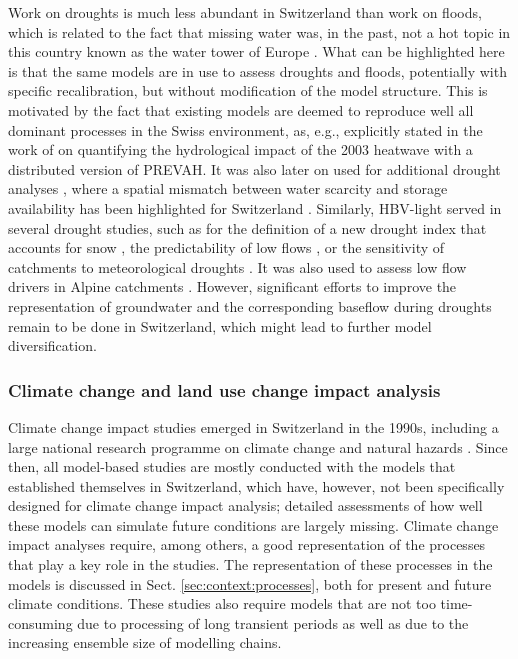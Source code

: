 \documentclass[10pt,a4paper]{article}
\begin{document}
Work on droughts is much less abundant in Switzerland than work on floods, which is related to the fact that missing water was, in the past, not a hot topic in this country known as the water tower of Europe \citep{Milano2015}. What can be highlighted here is that the same models are in use to assess droughts and floods, potentially with specific recalibration, but without modification of the model structure. This is motivated by the fact that existing models are deemed to reproduce well all dominant processes in the Swiss environment, as, e.g., explicitly stated in the work of \citet{Zappa2007a} on quantifying the hydrological impact of the 2003 heatwave with a distributed version of PREVAH. It was also later on used for additional drought analyses \citep{Brunner2019e, Zappa2019}, where a spatial mismatch between water scarcity and storage availability has been highlighted for Switzerland \citep{Brunner2019e}. 
Similarly, HBV-light served in several drought studies, such as for the definition of a new drought index that accounts for snow \citep{Staudinger2014}, the predictability of low flows \citep{Staudinger2014a}, or the sensitivity of catchments to meteorological droughts \citep{Staudinger2015}. It was also used to assess low flow drivers in Alpine catchments \citep{Arnoux2020}. However, significant efforts to improve the representation of groundwater and the corresponding baseflow during droughts remain to be done in Switzerland, which might lead to further model diversification.


\subsubsection{Climate change and land use change impact analysis}
\label{sec:context:climatechange}

Climate change impact studies emerged in Switzerland in the 1990s, including a large national research programme on climate change and natural hazards \citep{SNFS2021}. Since then, all model-based studies are mostly conducted with the models that established themselves in Switzerland, which have, however, not been specifically designed for climate change impact analysis; detailed assessments of how well these models can simulate future conditions are largely missing. Climate change impact analyses require, among others, a good representation of the processes that play a key role in the studies. The representation of these processes in the models is discussed in Sect. \ref{sec:context:processes}, both for present and future climate conditions. These studies also require models that are not too time-consuming due to processing of long transient periods as well as due to the increasing ensemble size of modelling chains.
\end{document}
